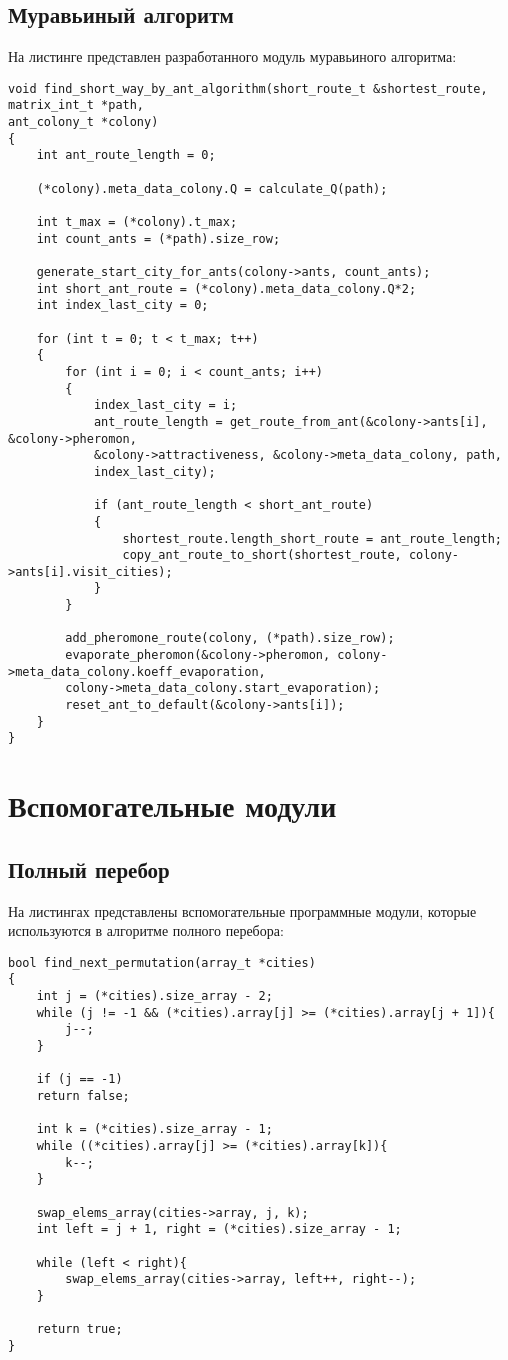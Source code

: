 \subsection{Муравьиный алгоритм}
На листинге представлен разработанного модуль муравьиного алгоритма:
\newpage
\begin{lstlisting}[label=ant_algorithm,caption=Программный код муравьиного алгоритма.]
void find_short_way_by_ant_algorithm(short_route_t &shortest_route, matrix_int_t *path,
ant_colony_t *colony)
{
	int ant_route_length = 0;
	
	(*colony).meta_data_colony.Q = calculate_Q(path);
	
	int t_max = (*colony).t_max;
	int count_ants = (*path).size_row;
	
	generate_start_city_for_ants(colony->ants, count_ants);
	int short_ant_route = (*colony).meta_data_colony.Q*2;
	int index_last_city = 0;
	
	for (int t = 0; t < t_max; t++)
	{
		for (int i = 0; i < count_ants; i++)
		{
			index_last_city = i;
			ant_route_length = get_route_from_ant(&colony->ants[i], &colony->pheromon,
			&colony->attractiveness, &colony->meta_data_colony, path,
			index_last_city);
			
			if (ant_route_length < short_ant_route)
			{
				shortest_route.length_short_route = ant_route_length;
				copy_ant_route_to_short(shortest_route, colony->ants[i].visit_cities);
			}            	
		}

		add_pheromone_route(colony, (*path).size_row);
		evaporate_pheromon(&colony->pheromon, colony->meta_data_colony.koeff_evaporation,
		colony->meta_data_colony.start_evaporation);
		reset_ant_to_default(&colony->ants[i]);
	}
}
\end{lstlisting}

\section{Вспомогательные модули}
\subsection{Полный перебор}
На листингах представлены вспомогательные программные модули, которые используются в алгоритме полного перебора:
\begin{lstlisting}[label=permutation,caption=Программный код нахождения следующей перестановки.]
bool find_next_permutation(array_t *cities)
{
	int j = (*cities).size_array - 2;
	while (j != -1 && (*cities).array[j] >= (*cities).array[j + 1]){
		j--;
	}
	
	if (j == -1)
	return false;
	
	int k = (*cities).size_array - 1;
	while ((*cities).array[j] >= (*cities).array[k]){
		k--;
	}
	
	swap_elems_array(cities->array, j, k);
	int left = j + 1, right = (*cities).size_array - 1;
	
	while (left < right){
		swap_elems_array(cities->array, left++, right--);
	}
	
	return true;
}
\end{lstlisting}

